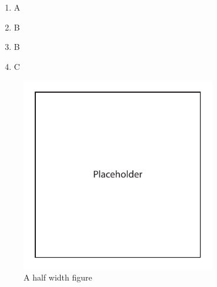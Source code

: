 \documentclass{epsrc}
\begin{document}
\begin{enumerate}[label=\bfseries Objective \arabic*:, align=left]
	\item A
	\item B
	\item B
	\item C
\end{enumerate}

\lipsum[25-26]

\begin{figure}
\vspace{-11pt}
	\begin{center}
		\includegraphics[width=8.5cm]{img/placeholder_image}
			\vspace{-30pt}
		\caption{A half width figure}
		\label{fig:half}
	\end{center}
\end{figure}

\lipsum[27-30]

\end{document}
